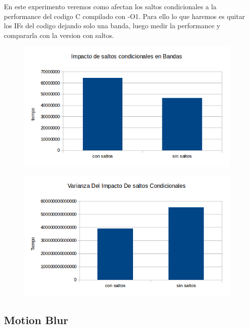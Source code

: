 \documentclass[a4paper]{article}
\begin{document}
En este experimento veremos como afectan los saltos condicionales a la performance del codigo C compilado con -O1. Para ello lo que haremos es quitar los IFs del codigo dejando solo una banda, luego medir la performance y compararla con la version con saltos.

\begin{figure}[h!]
  \begin{center}
  \includegraphics[scale=0.66]{Graficos3.1/per.png}
  \label{nombreparareferenciar1}
  \end{center}
\end{figure}

\begin{figure}[h!]
  \begin{center}
  \includegraphics[scale=0.66]{Graficos3.1/var.png}
  \label{nombreparareferenciar1}
  \end{center}
\end{figure}

\newpage
\subsection{Motion Blur}
\end{document}
